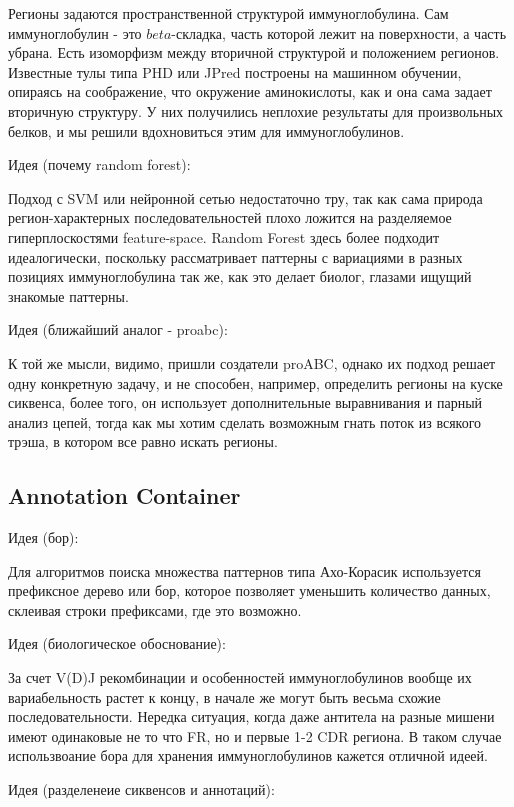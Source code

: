 \documentclass[a4paper,12pt]{article}
\begin{document}
  Регионы задаются пространственной структурой иммуноглобулина. Сам
  иммуноглобулин - это $beta$-складка, часть которой лежит на
  поверхности, а часть убрана. Есть изоморфизм между вторичной
  структурой и положением регионов. Известные тулы типа PHD или JPred
  построены на машинном обучении, опираясь на соображение, что
  окружение аминокислоты, как и она сама задает вторичную структуру. У
  них получились неплохие результаты для произвольных белков, и мы
  решили вдохновиться этим для иммуноглобулинов.

  Идея (почему random forest):

  Подход с SVM или нейронной сетью недостаточно тру, так как сама
  природа регион-характерных последовательностей плохо ложится на
  разделяемое гиперплоскостями feature-space. Random Forest здесь
  более подходит идеалогически, поскольку рассматривает паттерны с
  вариациями в разных позициях иммуноглобулина так же, как это делает
  биолог, глазами ищущий знакомые паттерны.

  Идея (ближайший аналог - proabc):

  К той же мысли, видимо, пришли создатели proABC, однако их подход
  решает одну конкретную задачу, и не способен, например, определить
  регионы на куске сиквенса, более того, он использует дополнительные
  выравнивания и парный анализ цепей, тогда как мы хотим сделать
  возможным гнать поток из всякого трэша, в котором все равно искать регионы.

  \subsection{Annotation Container}

  Идея (бор):

  Для алгоритмов поиска множества паттернов типа Ахо-Корасик
  используется префиксное дерево или бор, которое позволяет уменьшить
  количество данных, склеивая строки префиксами, где это возможно.

  Идея (биологическое обоснование):

  За счет V(D)J рекомбинации и особенностей иммуноглобулинов вообще их
  вариабельность растет к концу, в начале же могут быть весьма схожие
  последовательности. Нередка ситуация, когда даже антитела на разные
  мишени имеют одинаковые не то что FR, но и первые 1-2 CDR региона.
  В таком случае использвоание бора для хранения иммуноглобулинов
  кажется отличной идеей.

  Идея (разделенеие сиквенсов и аннотаций):
\end{document}
